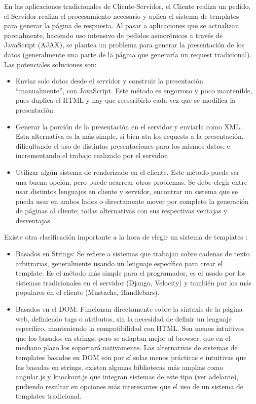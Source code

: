\documentclass[doc,helv,longtable]{article}
\begin{document}
En las aplicaciones tradicionales de Cliente-Servidor, el Cliente realiza un pedido, el Servidor realiza el procesamiento necesario y aplica el sistema de templates para generar la página de respuesta. Al pasar a aplicaciones que se actualizan parcialmente, haciendo uso intensivo de pedidos asincrónicos a través de JavaScript (AJAX), se plantea un problema para generar la presentación de los datos (generalmente una parte de la página que generaría un request tradicional). Las potenciales soluciones son:
\begin{itemize}
\item  Enviar solo datos desde el servidor y construir la presentación “manualmente”, con JavaScript. Este método es engorroso y poco mantenible, pues duplica el HTML y hay que reescribirlo cada vez que se modifica la presentación.
\item  Generar la porción de la presentación en el servidor y enviarla como XML. Esta alternativa es la más simple, si bien ata los requests a la presentación, dificultando el uso de distintas presentaciones para los mismos datos, e incrementando el trabajo realizado por el servidor.
\item  Utilizar algún sistema de renderizado en el cliente. Este método puede ser una buena opción, pero puede acarrear otros problemas. Se debe elegir entre usar distintos lenguajes en cliente y servidor, encontrar un sistema que se pueda usar en ambos lados o directamente mover por completo la generación de páginas al cliente; todas alternativas con sus respectivas ventajas y desventajas\cite{clientside}\cite{dust}.

\end{itemize}


Existe otra clasificación importante a la hora de elegir un sistema de templates \cite{template2}\cite{richjs}:
\begin{itemize}
\item  Basados en Strings: Se refiere a sistemas que trabajan sobre cadenas de texto arbitrarias, generalmente usando un lenguaje específico para crear el template. Es el método más simple para el programador, es el usado por los sistemas tradicionales en el servidor (Django, Velocity) y también por los más populares en el cliente (Mustache, Handlebars).
\item  Basados en el DOM: Funcionan directamente sobre la sintaxis de la página web, definiendo tags o atributos, sin la necesidad de definir un lenguaje específico, manteniendo la compatibilidad con HTML. Son menos intuitivos que los basados en strings, pero se adaptan mejor al browser, que en el mediano plazo los soportará nativamente\cite{richjs}. Las alternativas de sistemas de templates basados en DOM son por sí solas menos prácticas e intuitivas que las basadas en strings, existen algunas bibliotecas más amplias como angular.js y knockout.js que integran sistemas de este tipo (ver adelante), pudiendo resultar en opciones más interesantes que el uso de un sistema de templates tradicional.

\end{itemize}
\end{document}
